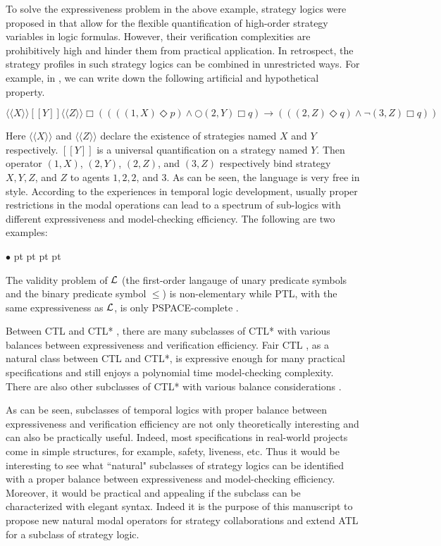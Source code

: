 \documentclass[11pt]{article}
\newcommand{\ldbrac}{[\![}
\newcommand{\rdbrac}{]\!]}
\newcommand{\ldabrac}{\langle\!\langle}
\newcommand{\rdabrac}{\rangle\!\rangle}
\newcommand{\pfrr}{\Box}
\newcommand{\pevt}{\Diamond}
\newcommand{\nxt}{\bigcirc}
\newenvironment{list1}{\begin{list}{$\bullet$}
{\topsep 0 pt \parsep 0 pt \partopsep 0 pt \itemsep 0 pt}}{\end{list}}
\begin{document}
\label{reply2.motive1} 
To solve the expressiveness problem in the above example, 
strategy logics were proposed in \cite{CLM10,CHP10,MMV10} that 
allow for the flexible quantification of high-order 
strategy variables in logic formulas.  
However, their verification complexities are prohibitively high 
and hinder them from practical application.  
In retrospect, the strategy profiles in such strategy logics 
can be combined in unrestricted ways.  
For example, in \cite{MMV10}, we can 
write down the following artificial and hypothetical property.  
\begin{center} 
$\ldabrac X\rdabrac \ldbrac Y\rdbrac\ldabrac Z\rdabrac 
\pfrr ((((1,X)\pevt p) \wedge \nxt (2,Y) \pfrr q)\rightarrow
(((2,Z)\pevt q)\wedge\neg(3,Z)\pfrr q))$
\end{center} 
Here $\ldabrac X\rdabrac$ and $\ldabrac Z\rdabrac$ declare the 
existence of strategies named $X$ and $Y$ respectively.  
$\ldbrac Y\rdbrac$ is a universal quantification on a strategy named $Y$.  
Then operator $(1,X)$, $(2,Y)$, $(2,Z)$, and $(3,Z)$ 
respectively bind strategy $X, Y, Z$, and $Z$ to agents $1, 2, 2$, and $3$.  
As can be seen, the language is very free in style.  
According to the experiences in temporal logic development, 
usually proper restrictions in the modal operations can lead to 
a spectrum of sub-logics with different expressiveness and model-checking efficiency.  
The following are two examples: 
\begin{list1} 
\item The validity problem of $\cal L$ (the first-order langauge of 
  unary predicate symbols and the binary predicate symbol $\leq$) 
  is non-elementary \cite{Stockmeyer74} while 
  PTL, with the same expressiveness as $\cal L$, is only PSPACE-complete \cite{SC85}.  
\item Between CTL \cite{CES86} and CTL* \cite{EH85,EH86}, there are many subclasses of CTL* with various balances 
  between expressiveness and verification efficiency.  
  Fair CTL \cite{EL87}, as a natural class between CTL and CTL*, 
  is expressive enough for many practical specifications and 
  still enjoys a polynomial time model-checking complexity.  
  There are also other subclasses of CTL* with various balance considerations \cite{BPM83,EC80,EH86,Lamport80}.  
\end{list1} 
As can be seen, subclasses of temporal logics with proper balance between 
expressiveness and verification efficiency are not only theoretically interesting and 
can also be practically useful.  
Indeed, most specifications in real-world projects come 
in simple structures, for example, safety, liveness, etc. 
Thus it would be interesting to see what ``natural" subclasses of strategy logics 
can be identified with a proper balance between expressiveness and model-checking efficiency.  
Moreover, it would be practical and appealing if the subclass 
can be characterized with elegant syntax.  
Indeed it is the purpose of this manuscript to propose new natural modal operators 
for strategy collaborations and extend ATL for a subclass of strategy logic.  
\label{reply2.motive2}
\end{document}
